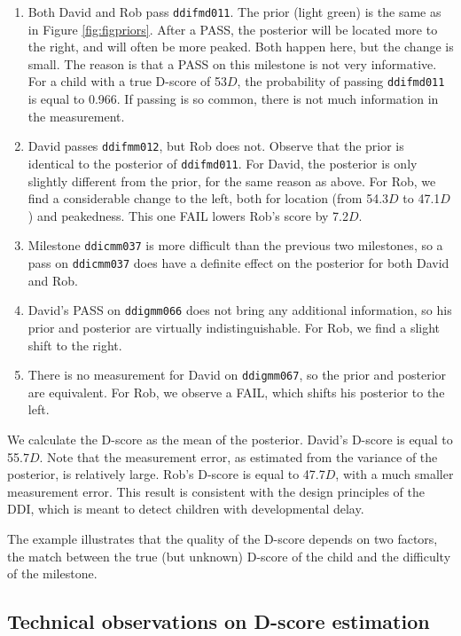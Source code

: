 \documentclass[
]{book}
\providecommand{\tightlist}{%
  \setlength{\itemsep}{0pt}\setlength{\parskip}{0pt}}
\begin{document}
\begin{enumerate}
\def\labelenumi{\arabic{enumi}.}
\tightlist
\item
  Both David and Rob pass \texttt{ddifmd011}. The prior (light green) is the same as in Figure \ref{fig:figpriors}. After a PASS, the posterior will be located more to the right, and will often be more peaked. Both happen here, but the change is small. The reason is that a PASS on this milestone is not very informative. For a child with a true D-score of 53\(D\), the probability of passing \texttt{ddifmd011} is equal to 0.966. If passing is so common, there is not much information in the measurement.
\item
  David passes \texttt{ddifmm012}, but Rob does not. Observe that the prior is identical to the posterior of \texttt{ddifmd011}. For David, the posterior is only slightly different from the prior, for the same reason as above. For Rob, we find a considerable change to the left, both for location (from 54.3\(D\) to 47.1\(D\)) and peakedness. This one FAIL lowers Rob's score by 7.2\(D\).
\item
  Milestone \texttt{ddicmm037} is more difficult than the previous two milestones, so a pass on \texttt{ddicmm037} does have a definite effect on the posterior for both David and Rob.
\item
  David's PASS on \texttt{ddigmm066} does not bring any additional information, so his prior and posterior are virtually indistinguishable. For Rob, we find a slight shift to the right.
\item
  There is no measurement for David on \texttt{ddigmm067}, so the prior and posterior are equivalent. For Rob, we observe a FAIL, which shifts his posterior to the left.
\end{enumerate}

We calculate the D-score as the mean of the posterior. David's D-score is equal to 55.7\(D\). Note that the measurement error, as estimated from the variance of the posterior, is relatively large. Rob's D-score is equal to 47.7\(D\), with a much smaller measurement error. This result is consistent with the design principles of the DDI, which is meant to detect children with developmental delay.

The example illustrates that the quality of the D-score depends on two factors, the match between the true (but unknown) D-score of the child and the difficulty of the milestone.

\hypertarget{technical-observations-on-d-score-estimation}{%
\subsection{Technical observations on D-score estimation}\label{technical-observations-on-d-score-estimation}}
\end{document}
